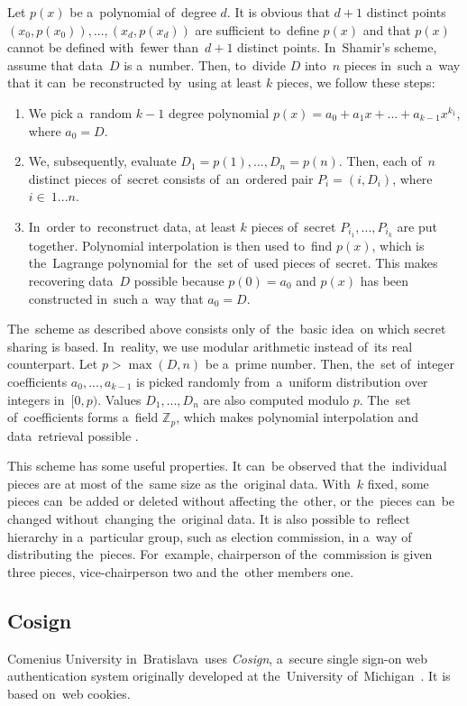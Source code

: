 Let $p(x)$ be a~polynomial of~degree $d$. It is obvious that $d+1$ distinct points $(x_0, p(x_0)),...,(x_d, p(x_d))$ are sufficient to~define $p(x)$ and that $p(x)$ cannot be defined with~fewer than~$d+1$ distinct points. 
\bigbreak
In~Shamir's scheme, assume that data~$D$ is a~number. Then, to~divide $D$ into~$n$ pieces in~such a~way that it can~be reconstructed by~using at least $k$ pieces, we follow these steps:
\begin{enumerate}
\item We pick a~random $k-1$ degree polynomial $p(x) = a_0 + a_1x + ... + a_{k-1}x^{k_1}$, where $a_0 = D$. 
\item We, subsequently, evaluate $D_1 = p(1), ..., D_n = p(n)$. Then, each of~$n$ distinct pieces of~secret consists of~an~ordered pair $P_i = (i, D_i)$, where $i \in~1...n$.
\item In~order to~reconstruct data, at least $k$ pieces of~secret $P_{i_1}, ... , P_{i_k}$ are put together. Polynomial interpolation is then used to~find $p(x)$, which is the~Lagrange polynomial for~the~set of~used pieces of~secret. This makes recovering data~$D$ possible because $p(0) = a_0$ and $p(x)$ has been constructed in~such a~way that $a_0 = D$.
\end{enumerate}
The~scheme as described above consists only of~the~basic idea~on which secret sharing is based. In~reality, we use modular arithmetic instead of~its real counterpart. Let $p > \max(D, n)$ be a~prime number. Then, the~set of~integer coefficients $a_0, ..., a_{k-1}$ is picked randomly from~a~uniform distribution over integers in~$[0, p)$. Values $D_1, ..., D_n$ are also computed modulo $p$. The~set of~coefficients forms a~field $\mathbb{Z}_p$, which makes polynomial interpolation and data~retrieval possible \cite{Shamir}.

This scheme has some useful properties. It can~be observed that the~individual pieces are at most of the~same size as the~original data. With~$k$ fixed,  some pieces can~be added or deleted without affecting the~other, or the~pieces can~be changed without~changing the~original data. It is also possible to~reflect hierarchy in a~particular group, such as election commission, in a~way of distributing the~pieces. For~example, chairperson of the~commission is given three pieces, vice-chairperson two and the~other members one.
\subsection{Cosign}
Comenius University in~Bratislava~uses \emph{Cosign}, a~secure single sign-on web authentication system originally developed at the~University of~Michigan~\cite{Cosign}. It is based on~web cookies. 

